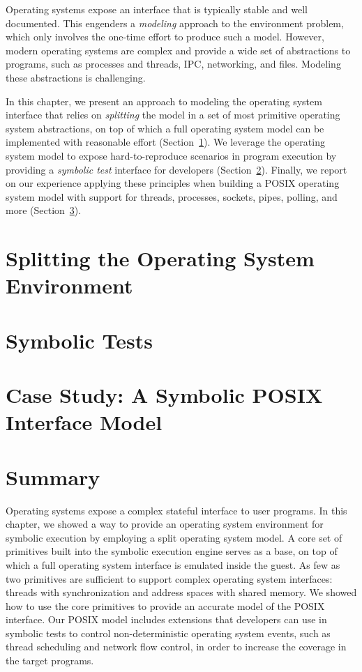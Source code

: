 
Operating systems expose an interface that is typically stable and well documented.
%
This engenders a \emph{modeling} approach to the environment problem, which only involves the one-time effort to produce such a model.
%
However, modern operating systems are complex and provide a wide set of abstractions to programs, such as processes and threads, IPC, networking, and files.  Modeling these abstractions is challenging.

In this chapter, we present an approach to modeling the operating system interface that relies on \emph{splitting} the model in a set of most primitive operating system abstractions, on top of which a full operating system model can be implemented with reasonable effort (Section~\ref{sec:cloud9:splitmodel}).
%
We leverage the operating system model to expose hard-to-reproduce scenarios in program execution by providing a \emph{symbolic test} interface for developers (Section~\ref{sec:cloud9:symtests}).
%
Finally, we report on our experience applying these principles when building a POSIX operating system model with support for threads, processes, sockets, pipes, polling, and more (Section~\ref{sec:cloud9:posix}).


\section{Splitting the Operating System Environment}
\label{sec:cloud9:splitmodel}


\section{Symbolic Tests}
\label{sec:cloud9:symtests}


\section{Case Study: A Symbolic POSIX Interface Model}
\label{sec:cloud9:posix}


\section{Summary}

Operating systems expose a complex stateful interface to user programs.
%
In this chapter, we showed a way to provide an operating system environment for symbolic execution by employing a split operating system model.  A core set of primitives built into the symbolic execution engine serves as a base, on top of which a full operating system interface is emulated inside the guest.
%
As few as two primitives are sufficient to support complex operating system interfaces: threads  with synchronization and address spaces with shared memory.
%
We showed how to use the core primitives to provide an accurate model of the POSIX interface.
%
Our POSIX model includes extensions that developers can use in symbolic tests to control non-deterministic operating system events, such as thread scheduling and network flow control, in order to increase the coverage in the target programs.

